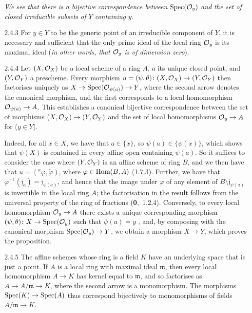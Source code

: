 \emph{We see  that there is a bijective correspondence between
$\operatorname{Spec}(\mathcal{O}_y)$ and the set of closed irreducible subsets of $Y$ containing $y$.}
    
\begin{env}[Corollary]{2.4.3}
\label{cor-1.2.4.3}
For $y\in Y$ to be the generic point of an
irreducible component of $Y$, it is necessary and sufficient that the only prime
ideal of the local ring $\mathcal{O}_y$ is its maximal ideal (\emph{in other words, that
$\mathcal{O}_y$ is of \emph{dimension zero}}).
\end{env}
    
\begin{env}[Proposition]{2.4.4}
\label{prop-1.2.4.4}
Let $(X,\mathcal{O}_X)$ be a local scheme of a ring
$A$, $a$ its unique closed point, and $(Y,\mathcal{O}_Y)$ a prescheme.  Every morphism
$u=(\psi,\theta)\colon(X,\mathcal{O}_X)\to(Y,\mathcal{O}_Y)$ then factorises uniquely as
$X\to\operatorname{Spec}(\mathcal{O}_{\psi(a)})\to Y$, where the second arrow denotes the canonical
morphism, and the first corresponds to a local homomorphism $\mathcal{O}_{\psi(a)}\to A$.
This establishes a canonical bijective correspondence between the set of
morphisms $(X,\mathcal{O}_X)\to(Y,\mathcal{O}_Y)$ and the set of local homomorphisms $\mathcal{O}_y\to A$
for ($y\in Y$).
\end{env}
    
Indeed, for all $x\in X$, we have that $a\in\overline{\{x\}}$, so
$\psi(a)\in\overline{\{\psi(x)\}}$, which shows that $\psi(X)$ is contained in
every affine open containing $\psi(a)$. So it suffices to consider the case
where $(Y,\mathcal{O}_Y)$ is an affine scheme of ring $B$, and we then have that
$u=(^a\varphi,\tilde{\varphi})$, where $\varphi\in\operatorname{Hom}(B,A)$ (1.7.3).  Further,
we have that $\varphi^{-1}(\mathfrak{j}_a)=\mathfrak{j}_{\psi(a)}$, and hence
that the image under $\varphi$ of any element of
$B\setminus\mathfrak{j}_{\psi(a)}$ is invertible in the local ring $A$; the
factorisation in the result follows from the universal property of the ring of
fractions (\textbf{0},~1.2.4). Conversely, to every local homomorphism
$\mathcal{O}_y\to A$ there exists a unique corresponding morphism
$(\psi,\theta)\colon X\to\operatorname{Spec}(\mathcal{O}_y)$ such that $\psi(a)=y$ , and,
by composing with the canonical morphism $\operatorname{Spec}(\mathcal{O}_y)\to Y$, we obtain a morphism
$X\to Y$, which proves the proposition.
    
\begin{env}{2.4.5}
\label{env-1.2.4.5}
The affine schemes whose ring is a field $K$ have an
underlying space that is just a point. If $A$ is a local ring with maximal
ideal $\mathfrak{m}$, then every local homomorphism $A\to K$ has kernel equal to
$\mathfrak{m}$, and so factorises as $A\to A/\mathfrak{m}\to K$, where the
second arrow is a monomorphism. The morphisms $\operatorname{Spec}(K)\to\operatorname{Spec}(A)$ thus
correspond bijectively to monomorphisms of fields $A/\mathfrak{m}\to K$.
\end{env}
    
